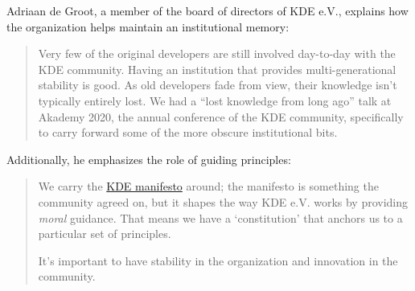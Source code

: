 \newpage

\begin{kaobox}[frametitle=The role of KDE e.V. in maintaining institutional memory for the KDE community]

Adriaan de Groot, a member of the board of directors of KDE e.V., explains how the organization helps maintain an institutional memory:

\begin{quote}

Very few of the original developers are still involved day-to-day with the KDE community.  Having an institution that provides multi-generational stability is good.  As old developers fade from view, their knowledge isn't typically entirely lost.  We had a ``lost knowledge from long ago'' talk at Akademy 2020, the annual conference of the KDE community, specifically to carry forward some of the more obscure institutional bits.

\end{quote}

Additionally, he emphasizes the role of guiding principles:

\begin{quote}

We carry the \href{https://manifesto.kde.org/}{KDE manifesto} around; the manifesto is something the community agreed on, but it shapes the way KDE e.V. works by providing \textit{moral} guidance.  That means we have a `constitution' that anchors us to a particular
set of principles.

It's important to have stability in the organization and innovation in the community.

\end{quote}

\end{kaobox}

